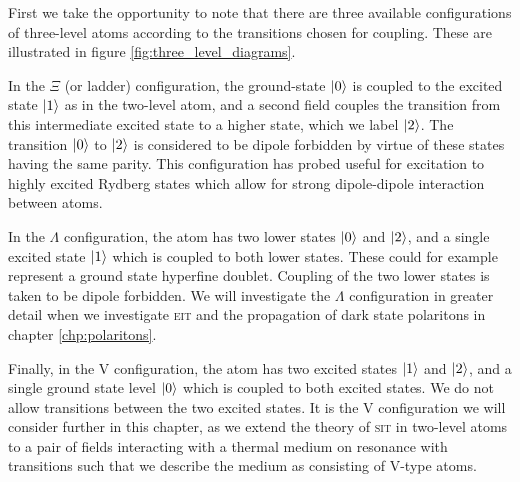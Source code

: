     First we take the opportunity to note that there are three available
    configurations of three-level atoms according to the transitions chosen for
    coupling. These are illustrated in figure \ref{fig:three_level_diagrams}.

    In the $\Xi$ (or ladder) configuration, the ground-state $\Ket{0}$ is
    coupled to the excited state $\Ket{1}$ as in the two-level atom, and a
    second field couples the transition from this intermediate excited state to
    a higher state, which we label $\Ket{2}$. The transition $\Ket{0}$ to
    $\Ket{2}$ is considered to be dipole forbidden by virtue of these states
    having the same parity. This configuration has probed useful for excitation
    to highly excited Rydberg states which allow for strong dipole-dipole
    interaction between atoms.\cite{Pritchard2010}

    In the $\Lambda$ configuration, the atom has two lower states $\Ket{0}$ and
    $\Ket{2}$, and a single excited state $\Ket{1}$ which is coupled to both
    lower states. These could for example represent a ground state hyperfine
    doublet. Coupling of the two lower states is taken to be dipole forbidden. We will
    investigate the $\Lambda$ configuration in greater detail when we
    investigate \textsc{eit} and the propagation of dark state polaritons in
    chapter \ref{chp:polaritons}.

    Finally, in the V configuration, the atom has two excited states $\Ket{1}$
    and $\Ket{2}$, and a single ground state level $\Ket{0}$ which is coupled to
    both excited states. We do not allow transitions between the two excited
    states. It is the V configuration we will consider further in this chapter,
    as we extend the theory of \textsc{sit} in two-level atoms to a pair of
    fields interacting with a thermal medium on resonance with transitions such
    that we describe the medium as consisting of V-type atoms.
